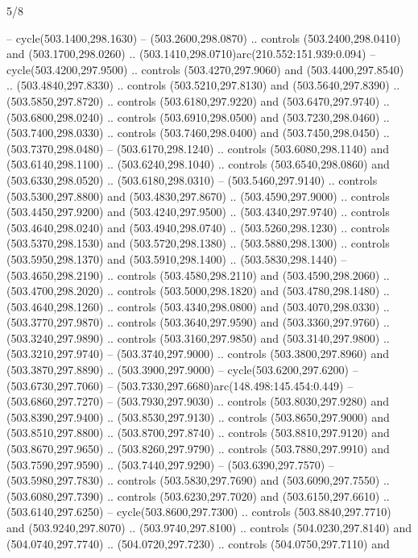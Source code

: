 \begin{flagdescription}{5/8}
\begin{scope}[xshift=0.5\flaglength,yshift=0.5\flagwidth,scale=\flagwidth/475.63]
\begin{scope}[y=0.8pt, x=0.8pt, yscale=-1, xscale=1,shift={(-450,-300)}]
\begin{scope}[cm={{1.0,0.0,0.0,1.0,(-0.0002,0.12556)}},cm={{1.0,0.0,0.0,1.0,(0.00179,0.0)}}]
\begin{scope}[cm={{1.11592,0.0,0.0,1.11592,(-106.89933,-41.77764)}}]
\begin{scope}[draw=black,fill=cfff]
\begin{scope}[fill=black]
  -- cycle(503.1400,298.1630) -- (503.2600,298.0870) .. controls
  (503.2400,298.0410) and (503.1700,298.0260) ..
  (503.1410,298.0710)arc(210.552:151.939:0.094) -- cycle(503.4200,297.9500) ..
  controls (503.4270,297.9060) and (503.4400,297.8540) .. (503.4840,297.8330) ..
  controls (503.5210,297.8130) and (503.5640,297.8390) .. (503.5850,297.8720) ..
  controls (503.6180,297.9220) and (503.6470,297.9740) .. (503.6800,298.0240) ..
  controls (503.6910,298.0500) and (503.7230,298.0460) .. (503.7400,298.0330) ..
  controls (503.7460,298.0400) and (503.7450,298.0450) .. (503.7370,298.0480) --
  (503.6170,298.1240) .. controls (503.6080,298.1140) and (503.6140,298.1100) ..
  (503.6240,298.1040) .. controls (503.6540,298.0860) and (503.6330,298.0520) ..
  (503.6180,298.0310) -- (503.5460,297.9140) .. controls (503.5300,297.8800) and
  (503.4830,297.8670) .. (503.4590,297.9000) .. controls (503.4450,297.9200) and
  (503.4240,297.9500) .. (503.4340,297.9740) .. controls (503.4640,298.0240) and
  (503.4940,298.0740) .. (503.5260,298.1230) .. controls (503.5370,298.1530) and
  (503.5720,298.1380) .. (503.5880,298.1300) .. controls (503.5950,298.1370) and
  (503.5910,298.1400) .. (503.5830,298.1440) -- (503.4650,298.2190) .. controls
  (503.4580,298.2110) and (503.4590,298.2060) .. (503.4700,298.2020) .. controls
  (503.5000,298.1820) and (503.4780,298.1480) .. (503.4640,298.1260) .. controls
  (503.4340,298.0800) and (503.4070,298.0330) .. (503.3770,297.9870) .. controls
  (503.3640,297.9590) and (503.3360,297.9760) .. (503.3240,297.9890) .. controls
  (503.3160,297.9850) and (503.3140,297.9800) .. (503.3210,297.9740) --
  (503.3740,297.9000) .. controls (503.3800,297.8960) and (503.3870,297.8890) ..
  (503.3900,297.9000) -- cycle(503.6200,297.6200) -- (503.6730,297.7060) --
  (503.7330,297.6680)arc(148.498:145.454:0.449) -- (503.6860,297.7270) --
  (503.7930,297.9030) .. controls (503.8030,297.9280) and (503.8390,297.9400) ..
  (503.8530,297.9130) .. controls (503.8650,297.9000) and (503.8510,297.8800) ..
  (503.8700,297.8740) .. controls (503.8810,297.9120) and (503.8670,297.9650) ..
  (503.8260,297.9790) .. controls (503.7880,297.9910) and (503.7590,297.9590) ..
  (503.7440,297.9290) -- (503.6390,297.7570) -- (503.5980,297.7830) .. controls
  (503.5830,297.7690) and (503.6090,297.7550) .. (503.6080,297.7390) .. controls
  (503.6230,297.7020) and (503.6150,297.6610) .. (503.6140,297.6250) --
  cycle(503.8600,297.7300) .. controls (503.8840,297.7710) and
  (503.9240,297.8070) .. (503.9740,297.8100) .. controls (504.0230,297.8140) and
  (504.0740,297.7740) .. (504.0720,297.7230) .. controls (504.0750,297.7110) and

\end{scope}
\end{scope}
\end{scope}
\end{scope}
\end{scope}
\end{scope}
\end{flagdescription}
